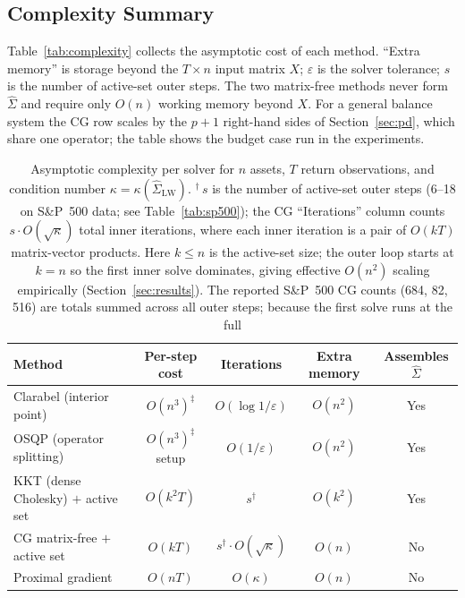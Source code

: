 \subsection{Complexity Summary}\label{ssec:complexity}

Table~\ref{tab:complexity} collects the asymptotic cost of each method.
``Extra memory'' is storage beyond the $T \times n$ input matrix $X$; $\varepsilon$
is the solver tolerance; $s$ is the number of active-set outer steps.  The two
matrix-free methods never form $\hat\Sigma$ and require only $O(n)$ working memory
beyond $X$. For a general balance system the CG row scales by the $p+1$ right-hand
sides of Section~\ref{sec:pd}, which share one operator; the table shows the budget
case run in the experiments.

\begin{table}[ht]
\centering
\footnotesize
\begin{tabular}{lcccc}
\toprule
Method & Per-step cost & Iterations & Extra memory & Assembles $\hat\Sigma$ \\
\midrule
Clarabel (interior point)    & $O(n^3)^{\ddagger}$        & $O(\log 1/\varepsilon)$              & $O(n^2)$ & Yes \\
OSQP (operator splitting)    & $O(n^3)^{\ddagger}$ setup        & $O(1/\varepsilon)$                   & $O(n^2)$ & Yes \\
KKT (dense Cholesky) $+$ active set & $O(k^2 T)$ & $s^{\dagger}$ & $O(k^2)$ & Yes \\
CG matrix-free $+$ active set& $O(kT)$         & $s^{\dagger} \cdot O(\sqrt{\kappa})$ & $O(n)$   & No \\
Proximal gradient            & $O(nT)$         & $O(\kappa)$                          & $O(n)$   & No \\
\bottomrule
\end{tabular}
\caption{Asymptotic complexity per solver for $n$ assets, $T$ return observations,
and condition number $\kappa = \kappa(\hat\Sigma_{\mathrm{LW}})$.
$^\dagger$\,$s$ is the number of active-set outer steps (6--18 on S\&P~500 data;
see Table~\ref{tab:sp500}); the CG ``Iterations'' column counts $s \cdot O(\sqrt\kappa)$
total inner iterations, where each inner iteration is a pair of $O(kT)$ matrix-vector
products. Here $k \leq n$ is the active-set size; the outer loop starts at $k=n$
so the first inner solve dominates, giving effective $O(n^2)$ scaling empirically
(Section~\ref{sec:results}). The reported S\&P~500 CG counts (684, 82, 516) are
totals summed across all outer steps; because the first solve runs at the full
}
\end{table}
